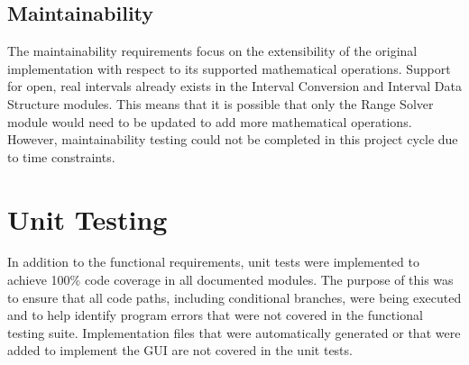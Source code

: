\documentclass[12pt, titlepage]{article}
\begin{document}
\subsection{Maintainability}
The maintainability requirements focus on the extensibility of the original 
implementation with respect to its supported mathematical operations. Support 
for open, real intervals already exists in the Interval Conversion and Interval 
Data Structure modules. This means that it is possible that only the Range 
Solver module would need to be updated to add more mathematical operations. 
However, maintainability testing could not be completed in this project cycle 
due to time constraints.

\section{Unit Testing}
In addition to the functional requirements, unit tests were implemented to 
achieve 100\% code coverage in all documented modules. The purpose of this was 
to ensure that all code paths, including conditional branches, were being 
executed and to help identify program errors that were not covered in the 
functional testing suite. Implementation files that were automatically 
generated or that were added to implement the GUI are not covered in the unit 
tests.
\end{document}
